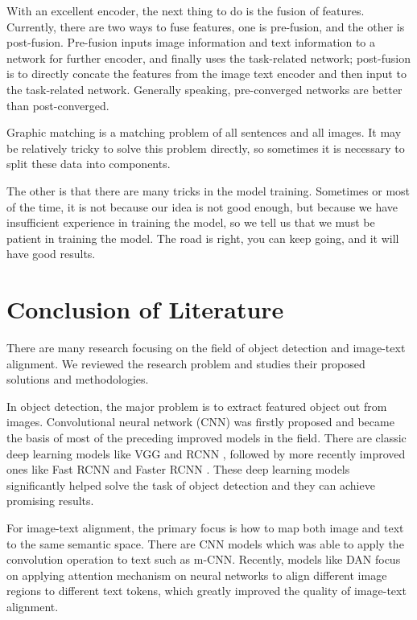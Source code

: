 With an excellent encoder, the next thing to do is the fusion of features. Currently, there are two ways to fuse features, one is pre-fusion, and the other is post-fusion. Pre-fusion inputs image information and text information to a network for further encoder, and finally uses the task-related network; post-fusion is to directly concate the features from the image text encoder and then input to the task-related network. Generally speaking, pre-converged networks are better than post-converged.

Graphic matching is a matching problem of all sentences and all images. It may be relatively tricky to solve this problem directly, so sometimes it is necessary to split these data into components. 

The other is that there are many tricks in the model training. Sometimes or most of the time, it is not because our idea is not good enough, but because we have insufficient experience in training the model, so we tell us that we must be patient in training the model. The road is right, you can keep going, and it will have good results.

\section{Conclusion of Literature}

There are many research focusing on the field of object detection and image-text alignment. We reviewed the research problem and studies their proposed solutions and methodologies. 

In object detection, the major problem is to extract featured object out from images. Convolutional neural network (CNN) \cite{cnn1} was firstly proposed and became the basis of most of the preceding improved models in the field. There are classic deep learning models like VGG \cite{vgg16} and RCNN \cite{rcnn}, followed by more recently improved ones like Fast RCNN \cite{fastrcnn} and Faster RCNN \cite{fasterrcnn}. These deep learning models significantly helped solve the task of object detection and they can achieve promising results.

For image-text alignment, the primary focus is how to map both image and text to the same semantic space. There are CNN models which was able to apply the convolution operation to text such as m-CNN. Recently, models like DAN focus on applying attention mechanism on neural networks to align different image regions to different text tokens, which greatly improved the quality of image-text alignment. 




